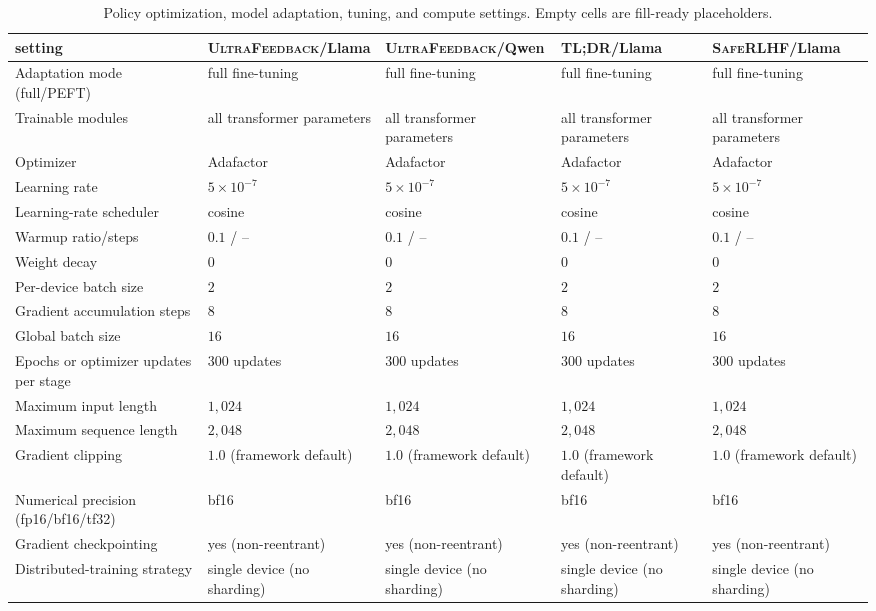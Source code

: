 \documentclass{article}
\theoremstyle{remark}
\theoremstyle{plain}
\begin{document}
\begin{table}[t]
\centering\scriptsize
\setlength{\tabcolsep}{1.1pt}
\caption{Policy optimization, model adaptation, tuning, and compute settings. Empty cells are fill-ready placeholders.}
\label{tab:policy-training-hparams}
\begin{tabular}{@{}p{}p{}p{}p{}p{}@{}}
\toprule
setting & \textsc{UltraFeedback}/Llama & \textsc{UltraFeedback}/Qwen & \textsc{TL;DR}/Llama & \textsc{SafeRLHF}/Llama \\
\midrule
Adaptation mode (full/PEFT) & full fine-tuning & full fine-tuning & full fine-tuning & full fine-tuning \\
Trainable modules & all transformer parameters & all transformer parameters & all transformer parameters & all transformer parameters \\
Optimizer & Adafactor & Adafactor & Adafactor & Adafactor \\
Learning rate & $5\times10^{-7}$ & $5\times10^{-7}$ & $5\times10^{-7}$ & $5\times10^{-7}$ \\
Learning-rate scheduler & cosine & cosine & cosine & cosine \\
Warmup ratio/steps & $0.1$ / -- & $0.1$ / -- & $0.1$ / -- & $0.1$ / -- \\
Weight decay & $0$ & $0$ & $0$ & $0$ \\
Per-device batch size & $2$ & $2$ & $2$ & $2$ \\
Gradient accumulation steps & $8$ & $8$ & $8$ & $8$ \\
Global batch size & $16$ & $16$ & $16$ & $16$ \\
Epochs or optimizer updates per stage & $300$ updates & $300$ updates & $300$ updates & $300$ updates \\
Maximum input length & $1{,}024$ & $1{,}024$ & $1{,}024$ & $1{,}024$ \\
Maximum sequence length & $2{,}048$ & $2{,}048$ & $2{,}048$ & $2{,}048$ \\
Gradient clipping & $1.0$ (framework default) & $1.0$ (framework default) & $1.0$ (framework default) & $1.0$ (framework default) \\
Numerical precision (fp16/bf16/tf32) & bf16 & bf16 & bf16 & bf16 \\
Gradient checkpointing & yes (non-reentrant) & yes (non-reentrant) & yes (non-reentrant) & yes (non-reentrant) \\
Distributed-training strategy & single device (no sharding) & single device (no sharding) & single device (no sharding) & single device (no sharding) \\

\end{tabular}
\end{table}
\end{document}
